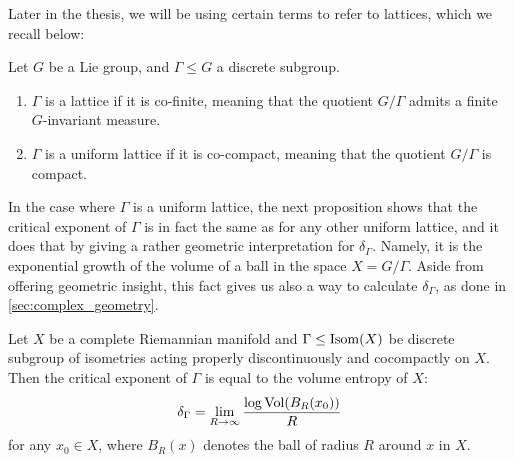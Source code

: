 \documentclass{report}
\begin{document}
Later in the thesis, we will be using certain terms to refer to lattices, which we recall below:
\begin{definition}
    Let $G$ be a Lie group, and $\Gamma \leq G$ a discrete subgroup. 
    \begin{enumerate}[label=(\roman*)]
        \item $\Gamma$ is a lattice if it is co-finite, meaning that the quotient $G/\Gamma$ admits a finite $G$-invariant measure.
        \item $\Gamma$ is a uniform lattice if it is co-compact, meaning that the quotient $G/\Gamma$ is compact.
    \end{enumerate}
\end{definition}

In the case where $\Gamma$ is a uniform lattice, the next proposition shows that the critical exponent of $\Gamma$ is in fact the same as for any other uniform lattice, and it does that by giving a rather geometric interpretation for $\delta_\Gamma$.
Namely, it is the exponential growth of the volume of a ball in the space $X = G/\Gamma$.
Aside from offering geometric insight, this fact gives us also a way to calculate $\delta_\Gamma$, as done in \cref{sec:complex_geometry}.
\begin{lemma}\label{lem:critical_exponent_entropy}
    Let $X$ be a complete Riemannian manifold and $\Gamma \leq \operatorname{Isom}(X)$ be discrete subgroup of isometries acting properly discontinuously and cocompactly on $X$.
    Then the critical exponent of $\Gamma$ is equal to the volume entropy of $X$:
    \[
    \delta_\Gamma = \lim_{R \to \infty} \frac{\log \operatorname{Vol}(B_R(x_0))}{R}
    \]
    for any $x_0 \in X$, where $B_R(x)$ denotes the ball of radius $R$ around $x$ in $X$.
\end{lemma}
\end{document}
